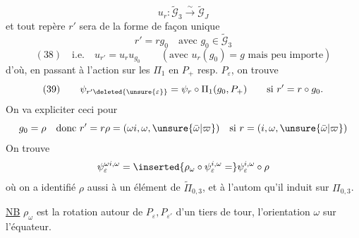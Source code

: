 \[
u_r:\widetilde{\mathcal G}_3\xrightarrow{\sim}\widetilde{\mathcal G}_J
\]
et tout repère $r'$  sera de la forme de façon unique
\[
r'=rg_0\quad\text{avec }g_0\in\widetilde{\mathcal G}_3
\]
\[
(38)\quad\text{i.e.}\quad u_{r'}=u_ru_{g_0}\qquad(\text{avec }u_r(g_0)=g\text{ mais peu importe})
\]
d'où, en passant à l'action sur les $\Pi_1$ en $P_+$ resp. $P_\varepsilon$, on trouve
\[
(39)\qquad \psi_{r'\deleted{\unsure{\varepsilon}}}=\psi_r\circ\Pi_1(g_0,P_+)\qquad\text{si }r'=r\circ g_0.
\]
On va expliciter ceci pour
\[
g_0=\rho\quad\text{donc }r'=r\rho=(\omega i,\omega,\unsure{\bar\omega|\varpi})\quad\text{si }r=(i,\omega,\unsure{\bar\omega|\varpi})
\]
On trouve
\[
\psi_\varepsilon^{\omega i,\omega}=\inserted{\rho_\omega\circ\psi_\varepsilon^{i,\omega}=}\psi_\varepsilon^{i,\omega}\circ\rho
\]
où on a identifié $\rho$ aussi à un élément de $\widetilde\Pi_{0,3}$, et à l'autom qu'il induit sur $\Pi_{0,3}$.

\uline{NB} $\rho_\omega$ est la rotation autour de $P_\varepsilon,P_{\varepsilon'}$ d'un tiers de tour,  l'orientation $\omega$ sur l'équateur.

